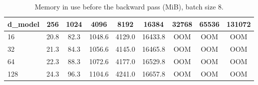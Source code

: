 \begin{table}
\centering
\begin{tabular}{lcccccccc}
\toprule
d\_model & 256 & 1024 & 4096 & 8192 & 16384 & 32768 & 65536 & 131072 \\
\midrule
16 & 20.8 & 82.3 & 1048.6 & 4129.0 & 16433.8 & OOM & OOM & OOM \\
32 & 21.3 & 84.3 & 1056.6 & 4145.0 & 16465.8 & OOM & OOM & OOM \\
64 & 22.3 & 88.3 & 1072.6 & 4177.0 & 16529.8 & OOM & OOM & OOM \\
128 & 24.3 & 96.3 & 1104.6 & 4241.0 & 16657.8 & OOM & OOM & OOM \\
\bottomrule
\end{tabular}
\caption{Memory in use before the backward pass (MiB), batch size 8.}
\label{tab:attn_memory_mib}
\end{table}
